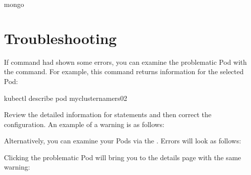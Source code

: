 \documentclass[letterpaper,10pt,english]{sphinxmanual}
\begin{document}
\begin{sphinxVerbatim}[commandchars=\\\{\}]
mongo 
\end{sphinxVerbatim}


\section{Troubleshooting}
\label{\detokenize{gke:troubleshooting}}
If  command had shown some errors, you can examine the problematic Pod with the  command.  For example, this command returns information for the selected Pod:

\begin{sphinxVerbatim}[commandchars=\\\{\}]
kubectl describe pod my\PYGZhy{}cluster\PYGZhy{}name\PYGZhy{}rs0\PYGZhy{}2
\end{sphinxVerbatim}

Review the detailed information for  statements and then correct the configuration. An example of a warning is as follows:
\begin{quote}

\end{quote}

Alternatively, you can examine your Pods via the . Errors will look as follows:


Clicking the problematic Pod will bring you to the details page with the same warning:

\end{document}
